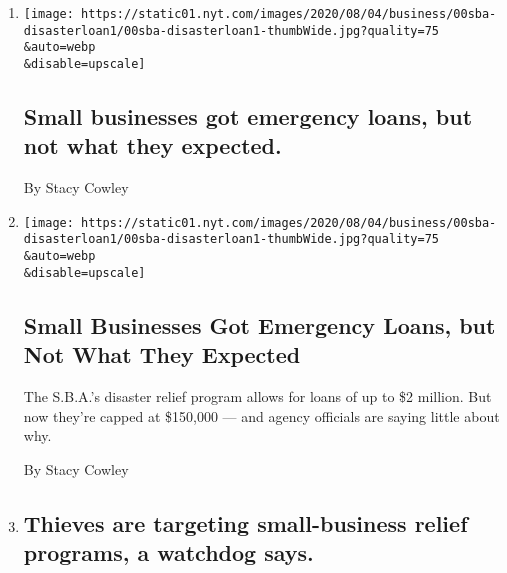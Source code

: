 \begin{enumerate}
\def\labelenumi{\arabic{enumi}.}
\item
  \href{/live/2020/08/03/business/stock-market-today-coronavirus/small-businesses-got-emergency-loans-but-not-what-they-expected}{}

  \texttt{[image: https://static01.nyt.com/images/2020/08/04/business/00sba-disasterloan1/00sba-disasterloan1-thumbWide.jpg?quality=75\\\&auto=webp\\\&disable=upscale]}

  \hypertarget{small-businesses-got-emergency-loans-but-not-what-they-expected}{%
  \subsection{Small businesses got emergency loans, but not what they
  expected.}\label{small-businesses-got-emergency-loans-but-not-what-they-expected}}

  By Stacy Cowley
\item
  \href{/2020/08/03/business/small-business-loans-coronavirus.html}{}

  \texttt{[image: https://static01.nyt.com/images/2020/08/04/business/00sba-disasterloan1/00sba-disasterloan1-thumbWide.jpg?quality=75\\\&auto=webp\\\&disable=upscale]}

  \hypertarget{small-businesses-got-emergency-loans-but-not-what-they-expected-1}{%
  \subsection{Small Businesses Got Emergency Loans, but Not What They
  Expected}\label{small-businesses-got-emergency-loans-but-not-what-they-expected-1}}

  The S.B.A.'s disaster relief program allows for loans of up to \$2
  million. But now they're capped at \$150,000 --- and agency officials
  are saying little about why.

  By Stacy Cowley
\item
  \href{/live/2020/07/28/business/stock-market-today-coronavirus/thieves-are-targeting-small-business-relief-programs-a-watchdog-says}{}

  \hypertarget{thieves-are-targeting-small-business-relief-programs-a-watchdog-says}{%
  \subsection{Thieves are targeting small-business relief programs, a
  watchdog
  says.}\label{thieves-are-targeting-small-business-relief-programs-a-watchdog-says}}


\end{enumerate}

